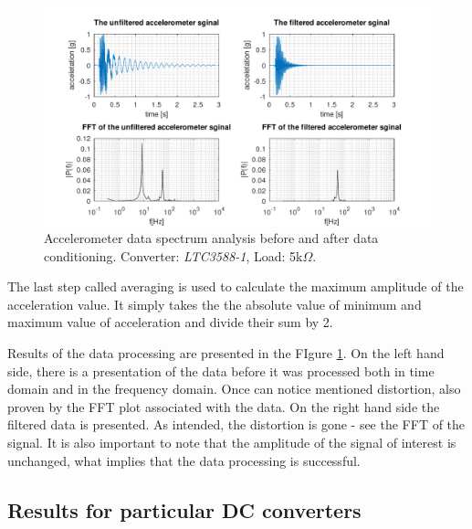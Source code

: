 \documentclass[12pt,a4paper]{article}
\begin{document}
\begin{landscape}
\begin{figure}[ht!]
\includegraphics[scale=1.2]{spectrum.pdf}
\caption{Accelerometer data spectrum analysis before and after data conditioning. Converter: \textit{LTC3588-1}, Load: 5k$\Omega$.}
\label{fig:spectrum}
\end{figure}
\end{landscape}

The last step called averaging is used to calculate the maximum amplitude of the acceleration value. It simply takes the the absolute value of minimum and maximum value of acceleration and divide their sum by 2.\par
Results of the data processing are presented in the FIgure \ref{fig:spectrum}. On the left hand side, there is a presentation of the data before it was processed both in time domain and in the frequency domain. Once can notice mentioned distortion, also proven by the FFT plot associated with the data. On the right hand side the filtered data is presented. As intended, the distortion is gone - see the FFT of the signal. It is also important to note that the amplitude of the signal of interest is unchanged, what implies that the data processing is successful.

\subsection{Results for particular DC converters}
\end{document}
